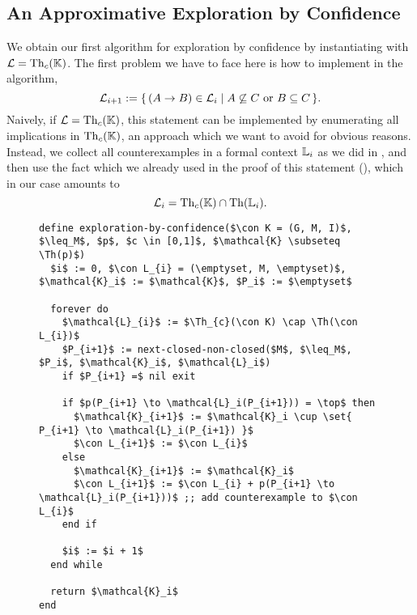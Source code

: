 \subsection{An Approximative Exploration by Confidence}
\label{sec:expl-conf-1}

We obtain our first algorithm for exploration by confidence by instantiating
 with $\mathcal{L} = \operatorname{Th}_{c}({\mathbb{K}})$.  The first problem
we have to face here is how to implement  in the
algorithm, \ie
\begin{equation*}
  \mathcal{L}_{i+1} := {\{\, (A \to B) \in \mathcal{L}_{i} \mid A \not\subseteq C \text{
      or } B \subseteq C \,\}}.
\end{equation*}
Naively, if $\mathcal{L} = \operatorname{Th}_{c}({\mathbb{K}})$, this statement can be implemented by
enumerating all implications in $\operatorname{Th}_{c}({\mathbb{K}})$, an approach which we want to avoid for
obvious reasons.  Instead, we collect all counterexamples in a formal context ${\mathbb{L}}_{i}$
as we did in , and then use the
fact which we already used in the proof of this statement (), which in our
case amounts to
\begin{equation*}
  \mathcal{L}_{i} = \operatorname{Th}_{c}({\mathbb{K}}) \cap \operatorname{Th}({\mathbb{L}}_{i}).
\end{equation*}


\begin{figure}[tp]
  \centering
  \begin{Algorithm}
    \label{alg:exploration-by-confidence-first-version}
    \hspace*{0cm}
\begin{lstlisting}
define exploration-by-confidence($\con K = (G, M, I)$, $\leq_M$, $p$, $c \in [0,1]$, $\mathcal{K} \subseteq \Th(p)$)
  $i$ := 0, $\con L_{i} = (\emptyset, M, \emptyset)$, $\mathcal{K}_i$ := $\mathcal{K}$, $P_i$ := $\emptyset$

  forever do
    $\mathcal{L}_{i}$ := $\Th_{c}(\con K) \cap \Th(\con L_{i})$
    $P_{i+1}$ := next-closed-non-closed($M$, $\leq_M$, $P_i$, $\mathcal{K}_i$, $\mathcal{L}_i$)
    if $P_{i+1} =$ nil exit

    if $p(P_{i+1} \to \mathcal{L}_i(P_{i+1})) = \top$ then
      $\mathcal{K}_{i+1}$ := $\mathcal{K}_i \cup \set{ P_{i+1} \to \mathcal{L}_i(P_{i+1}) }$
      $\con L_{i+1}$ := $\con L_{i}$
    else
      $\mathcal{K}_{i+1}$ := $\mathcal{K}_i$
      $\con L_{i+1}$ := $\con L_{i} + p(P_{i+1} \to \mathcal{L}_i(P_{i+1}))$ ;; add counterexample to $\con L_{i}$
    end if

    $i$ := $i + 1$
  end while

  return $\mathcal{K}_i$  
end
\end{lstlisting}
  \end{Algorithm}
\end{figure}

